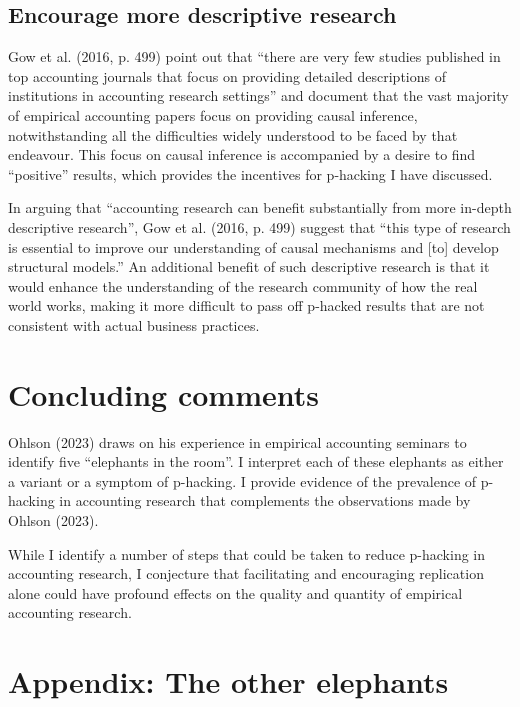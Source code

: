 \documentclass[
  letterpaper,
  DIV=11,
  numbers=noendperiod]{scrartcl}
\begin{document}
\hypertarget{encourage-more-descriptive-research}{%
\subsection{Encourage more descriptive
research}\label{encourage-more-descriptive-research}}

Gow et al. (2016, p. 499) point out that ``there are very few studies
published in top accounting journals that focus on providing detailed
descriptions of institutions in accounting research settings'' and
document that the vast majority of empirical accounting papers focus on
providing causal inference, notwithstanding all the difficulties widely
understood to be faced by that endeavour. This focus on causal inference
is accompanied by a desire to find ``positive'' results, which provides
the incentives for p-hacking I have discussed.

In arguing that ``accounting research can benefit substantially from
more in-depth descriptive research'', Gow et al. (2016, p. 499) suggest
that ``this type of research is essential to improve our understanding
of causal mechanisms and {[}to{]} develop structural models.'' An
additional benefit of such descriptive research is that it would enhance
the understanding of the research community of how the real world works,
making it more difficult to pass off p-hacked results that are not
consistent with actual business practices.

\hypertarget{concluding-comments}{%
\section{Concluding comments}\label{concluding-comments}}

Ohlson (2023) draws on his experience in empirical accounting seminars
to identify five ``elephants in the room''. I interpret each of these
elephants as either a variant or a symptom of p-hacking. I provide
evidence of the prevalence of p-hacking in accounting research that
complements the observations made by Ohlson (2023).

While I identify a number of steps that could be taken to reduce
p-hacking in accounting research, I conjecture that facilitating and
encouraging replication alone could have profound effects on the quality
and quantity of empirical accounting research.

\hypertarget{sec-other-elephants}{%
\section{Appendix: The other elephants}\label{sec-other-elephants}}
\end{document}
